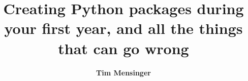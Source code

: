 \documentclass[10pt, aspectratio=169]{beamer}
\author[Tim Mensinger]{{\bf Tim Mensinger}}
\begin{document}
\title{%
Creating Python packages during your first year, and all the things that can go wrong}
\date{}

\begin{frame}
    \maketitle
    \note{~}
\end{frame}
\end{document}
